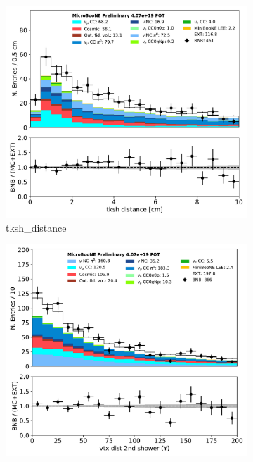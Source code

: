 \documentclass[a4paper]{article}
\begin{document}
\begin{figure}[H] 
\begin{center}
    \begin{subfigure}[b]{0.3\textwidth}
    \centering
    \includegraphics[width=1.00\textwidth]{1eNp/dataMCRun1/tksh_distance01152020.pdf}
    \caption{\label{fig:1eNp:dataMCRun1:tksh_distance} tksh\_distance }
    \end{subfigure}
    \begin{subfigure}[b]{0.3\textwidth}
    \centering
    \includegraphics[width=1.00\textwidth]{1eNp/dataMCRun1/secondshower_Y_vtxdist01152020.pdf}

\end{subfigure}
\end{center}
\end{figure}
\end{document}

